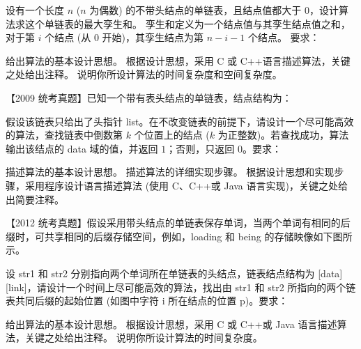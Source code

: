 \begin{qitems}
    \begin{bbox}
        \qitem 设有一个长度 $n$ ($n$ 为偶数) 的不带头结点的单链表，且结点值都大于 $0$，设计算法求这个单链表的最大孪生和。
        孪生和定义为一个结点值与其孪生结点值之和，对于第 $i$ 个结点 (从 $0$ 开始)，其孪生结点为第 $n-i-1$ 个结点。
        要求：
        \begin{subqitems}
            \subqitem 给出算法的基本设计思想。
            \subqitem 根据设计思想，采用 C 或 C++语言描述算法，关键之处给出注释。
            \subqitem 说明你所设计算法的时间复杂度和空间复杂度。
        \end{subqitems}
    \end{bbox}

    \begin{bbox}
        \qitem 【2009 统考真题】已知一个带有表头结点的单链表，结点结构为：
        \begin{center}
        \end{center}
        假设该链表只给出了头指针 list。在不改变链表的前提下，请设计一个尽可能高效的算法，查找链表中倒数第 $k$ 个位置上的结点 ($k$ 为正整数)。若查找成功，算法输出该结点的 data 域的值，并返回 $1$；否则，只返回 $0$。要求：
        \begin{subqitems}
            \subqitem 描述算法的基本设计思想。
            \subqitem 描述算法的详细实现步骤。
            \subqitem 根据设计思想和实现步骤，采用程序设计语言描述算法 (使用 C、C++或 Java 语言实现)，关键之处给出简要注释。
        \end{subqitems}
    \end{bbox}

    \begin{bbox}
        \qitem 【2012 统考真题】假设采用带头结点的单链表保存单词，当两个单词有相同的后缀时，可共享相同的后缀存储空间，例如，loading 和 being 的存储映像如下图所示。
        

        设 str1 和 str2 分别指向两个单词所在单链表的头结点，链表结点结构为 [data] [link]，请设计一个时间上尽可能高效的算法，找出由 str1 和 str2 所指向的两个链表共同后缀的起始位置 (如图中字符 i 所在结点的位置 p)。要求：
        \begin{subqitems}
            \subqitem 给出算法的基本设计思想。
            \subqitem 根据设计思想，采用 C 或 C++或 Java 语言描述算法，关键之处给出注释。
            \subqitem 说明你所设计算法的时间复杂度。
        \end{subqitems}
    \end{bbox}


\end{qitems}
